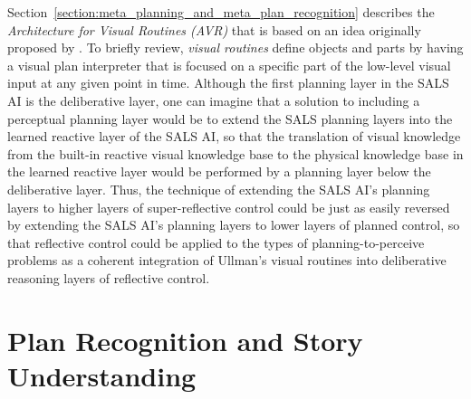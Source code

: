 {\mbox{Section~\ref{section:meta_planning_and_meta_plan_recognition}}}
describes the {\emph{Architecture for Visual Routines (AVR)}}
\cite[]{rao:1998} that is based on an idea originally proposed by
\cite{ullman:1984}.  To briefly review, {\emph{visual routines}}
define objects and parts by having a visual plan interpreter that is
focused on a specific part of the low-level visual input at any given
point in time.  Although the first planning layer in the SALS AI is
the deliberative layer, one can imagine that a solution to including a
perceptual planning layer would be to extend the SALS planning layers
into the learned reactive layer of the SALS AI, so that the
translation of visual knowledge from the built-in reactive visual
knowledge base to the physical knowledge base in the learned reactive
layer would be performed by a planning layer below the deliberative
layer.  Thus, the technique of extending the SALS AI's planning layers
to higher layers of super-reflective control could be just as easily
reversed by extending the SALS AI's planning layers to lower layers of
planned control, so that reflective control could be applied to the
types of planning-to-perceive problems as a coherent integration of
Ullman's visual routines into deliberative reasoning layers of
reflective control.

\section{Plan Recognition and Story Understanding}

